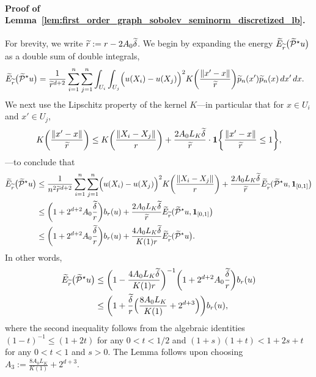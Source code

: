 \paragraph{Proof of Lemma~\ref{lem:first_order_graph_sobolev_seminorm_discretized_lb}.}
For brevity, we write $\widetilde{r} := r - 2A_0\widetilde{\delta}$. We begin by expanding the energy $\widetilde{E}_{\widetilde{r}}\bigl(\widetilde{\mathcal{P}}^{\star}u\bigr)$ as a double sum of double integrals,
\begin{align*}
\widetilde{E}_{\widetilde{r}}\bigl(\widetilde{\mathcal{P}}^{\star}u\bigr) & = \frac{1}{\widetilde{r}^{d + 2}} \sum_{i = 1}^{n} \sum_{j = 1}^{n} \int_{U_i} \int_{U_j} \Bigl(u(X_i) - u(X_j)\Bigr)^2 K\biggl(\frac{\|x' - x\|}{\widetilde{r}}\biggr) \widetilde{p}_n(x') \widetilde{p}_n(x) \,dx' \,dx.
\end{align*}
We next use the Lipschitz property of the kernel $K$---in particular that for $x \in U_i$ and $x' \in U_j$,
\begin{equation*}
K\biggl(\frac{\|x' - x\|}{\widetilde{r}}\biggr) \leq K\biggl(\frac{\|X_i - X_j\|}{r}\biggr) + \frac{2A_0L_K\widetilde{\delta}}{\widetilde{r}} \cdot \mathbf{1}\biggl\{\frac{\|x' - x\|}{\widetilde{r}} \leq 1\biggr\},
\end{equation*}
---to conclude that
\begin{align}
\widetilde{E}_{\widetilde{r}}\bigl(\widetilde{\mathcal{P}}^{\star}u\bigr) & \leq \frac{1}{n^2\widetilde{r}^{d + 2}} \sum_{i = 1}^{n} \sum_{j = 1}^{n} \Bigl(u(X_i) - u(X_j)\Bigr)^2 K\biggl(\frac{\|X_i - X_j\|}{r}\biggr) + \frac{2A_0L_K\widetilde{\delta}}{\widetilde{r}}\widetilde{E}_{\widetilde{r}}(\widetilde{\mathcal{P}}^{\star}u,\mathbf{1}_{[0,1]}\bigr) \nonumber \\
& \leq \biggl(1 + 2^{d + 2}A_0\frac{\widetilde{\delta}}{r}\biggr) b_r(u) + \frac{2A_0L_K\widetilde{\delta}}{\widetilde{r}}\widetilde{E}_{\widetilde{r}}(\widetilde{\mathcal{P}}^{\star}u,\mathbf{1}_{[0,1]}\bigr) \nonumber \\
& \leq \biggl(1 + 2^{d + 2}A_0\frac{\widetilde{\delta}}{r}\biggr) b_r(u) + \frac{4A_0L_K\widetilde{\delta}}{K(1)r} \widetilde{E}_{\widetilde{r}}(\widetilde{\mathcal{P}}^{\star}u\bigr). \nonumber 
\end{align}
In other words,
\begin{align*}
\widetilde{E}_{\widetilde{r}}\bigl(\widetilde{\mathcal{P}}^{\star}u\bigr) & \leq \biggl(1 - \frac{4A_0L_K\widetilde{\delta}}{K(1)r}\biggr)^{-1}\biggl(1 + 2^{d + 2}A_0\frac{\widetilde{\delta}}{r}\biggr) b_r(u) \\
& \leq \biggl(1 + \frac{\widetilde{\delta}}{r}\Bigl(\frac{8A_0L_K}{K(1)} + 2^{d + 3}\Bigr)\biggr) b_r(u),
\end{align*}
where the second inequality follows from the algebraic identities $(1 - t)^{-1} \leq (1 + 2t)$ for any $0 < t < 1/2$ and $(1 + s)(1 + t) < 1 + 2s + t$ for any $0 < t < 1$ and $s > 0$. The Lemma follows upon choosing $A_3 := \frac{8A_0L_K}{K(1)} + 2^{d + 3}$. 

